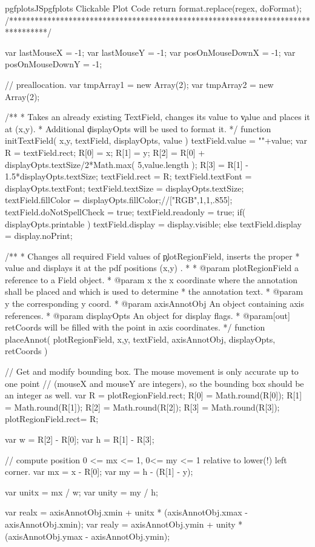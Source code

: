 {{\begin{insDLJS}[processAnnotatedPlot]{pgfplotsJS}{pgfplots Clickable Plot Code}
{    return format.replace(regex, doFormat);
}
/*********************************************************************************/


var lastMouseX = -1;
var lastMouseY = -1;
var posOnMouseDownX = -1;
var posOnMouseDownY = -1;

// preallocation.
var tmpArray1 = new Array(2);
var tmpArray2 = new Array(2);

/**
 * Takes an already existing TextField, changes its value to \c value and places it at (x,y).
 * Additional \c displayOpts will be used to format it.
 */
function initTextField( x,y, textField, displayOpts, value )
{
	textField.value = ""+value;
	var R = textField.rect;
	R[0] = x;
	R[1] = y;
	R[2] = R[0] + displayOpts.textSize/2*Math.max( 5,value.length );
	R[3] = R[1] - 1.5*displayOpts.textSize;
	textField.rect = R;
	textField.textFont = displayOpts.textFont;
	textField.textSize = displayOpts.textSize;
	textField.fillColor = displayOpts.fillColor;//["RGB",1,1,.855];
	textField.doNotSpellCheck = true;
	textField.readonly = true;
	if( displayOpts.printable )
		textField.display = display.visible;
	else
		textField.display = display.noPrint;
}

/**
 * Changes all required Field values of \c plotRegionField, inserts the proper
 * value and displays it at the pdf positions (x,y) .
 *
 * @param plotRegionField a reference to a Field object.
 * @param x the x coordinate where the annotation shall be placed and which is used to determine
 *  the annotation text.
 * @param y the corresponding y coord.
 * @param axisAnnotObj An object containing axis references.
 * @param displayOpts An object for display flags.
 * @param[out] retCoords will be filled with the point in axis coordinates.
 */
function placeAnnot( plotRegionField, x,y, textField, axisAnnotObj, displayOpts, retCoords )
{
	// Get and modify bounding box. The mouse movement is only accurate up to one point 
	// (mouseX and mouseY are integers), so the bounding box should be an integer as well.
	var R = plotRegionField.rect;
	R[0] = Math.round(R[0]);
	R[1] = Math.round(R[1]);
	R[2] = Math.round(R[2]);
	R[3] = Math.round(R[3]);
	plotRegionField.rect= R;

	var w = R[2] - R[0];
	var h = R[1] - R[3];

	// compute position 0 <= mx <= 1, 0<= my <= 1 relative to lower(!) left corner.
	var mx = x - R[0];
	var my = h - (R[1] - y);

	var unitx = mx / w;
	var unity = my / h;

	var realx = axisAnnotObj.xmin + unitx * (axisAnnotObj.xmax - axisAnnotObj.xmin);
	var realy = axisAnnotObj.ymin + unity * (axisAnnotObj.ymax - axisAnnotObj.ymin);

}
\end{insDLJS}}}
